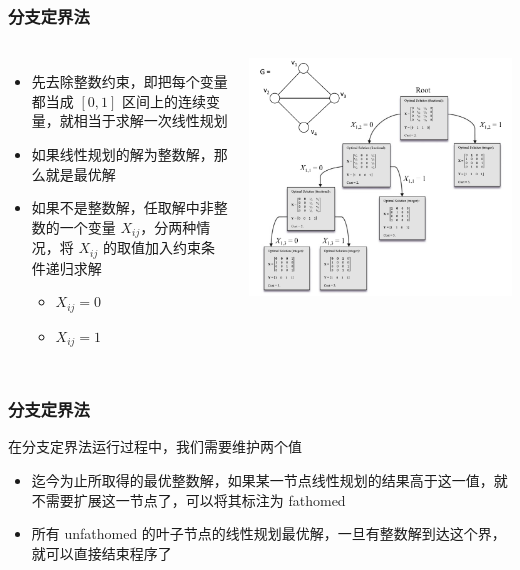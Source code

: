 \documentclass[UTF8]{beamer}
\begin{document}
\begin{frame}
  \frametitle{分支定界法}
    \begin{columns}
      \begin{itemize}
        \item 先去除整数约束，即把每个变量都当成 $[0, 1]$ 区间上的连续变量，就相当于求解一次线性规划
        \item 如果线性规划的解为整数解，那么就是最优解
        \item 如果不是整数解，任取解中非整数的一个变量 $X_{ij}$，分两种情况，将 $X_{ij}$ 的取值加入约束条件递归求解
        \begin{itemize}
          \item $X_{ij} = 0$
          \item $X_{ij} = 1$
        \end{itemize}
      \end{itemize}
      \includegraphics[scale=0.33]{figs/branch-bound.png}
    \end{columns}
\end{frame}

\begin{frame}
  \frametitle{分支定界法}
  
  在分支定界法运行过程中，我们需要维护两个值
  \begin{itemize}
    \item 迄今为止所取得的最优整数解，如果某一节点线性规划的结果高于这一值，就不需要扩展这一节点了，可以将其标注为 fathomed
    \item 所有 unfathomed 的叶子节点的线性规划最优解，一旦有整数解到达这个界，就可以直接结束程序了
  \end{itemize}

\end{frame}
\end{document}
